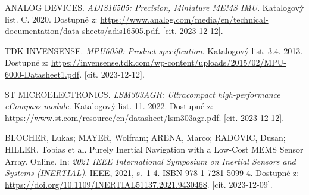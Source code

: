 

\begin{thebibliography}{99}

ANALOG DEVICES. \textit{ADIS16505: Precision, Miniature MEMS IMU}. Katalogový list. C. 2020. Dostupné z: \url{https://www.analog.com/media/en/technical-documentation/data-sheets/adis16505.pdf}. [cit. 2023-12-12].

TDK INVENSENSE. \textit{MPU6050: Product specification}. Katalogový list. 3.4. 2013. Dostupné z: \url{https://invensense.tdk.com/wp-content/uploads/2015/02/MPU-6000-Datasheet1.pdf}. [cit. 2023-12-12].

ST MICROELECTRONICS. \textit{LSM303AGR: Ultracompact high-performance eCompass module}. Katalogový list. 11. 2022. Dostupné z: \url{https://www.st.com/resource/en/datasheet/lsm303agr.pdf}. [cit. 2023-12-12].

BLOCHER, Lukas; MAYER, Wolfram; ARENA, Marco; RADOVIC, Dusan; HILLER, Tobias et al. Purely Inertial Navigation with a Low-Cost MEMS Sensor Array. Online. In: \textit{2021 IEEE International Symposium on Inertial Sensors and Systems (INERTIAL)}. IEEE, 2021, s.~1-4. ISBN 978-1-7281-5099-4. Dostupné z: \url{https://doi.org/10.1109/INERTIAL51137.2021.9430468}. [cit. 2023-12-09].


\end{thebibliography}


%
%
%
